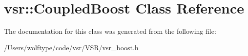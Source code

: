 \hypertarget{classvsr_1_1_coupled_boost}{\section{vsr\-:\-:Coupled\-Boost Class Reference}
\label{classvsr_1_1_coupled_boost}
}


The documentation for this class was generated from the following file\-:\begin{DoxyCompactItemize}
\item 
/\-Users/wolftype/code/vsr/\-V\-S\-R/vsr\-\_\-boost.\-h\end{DoxyCompactItemize}
